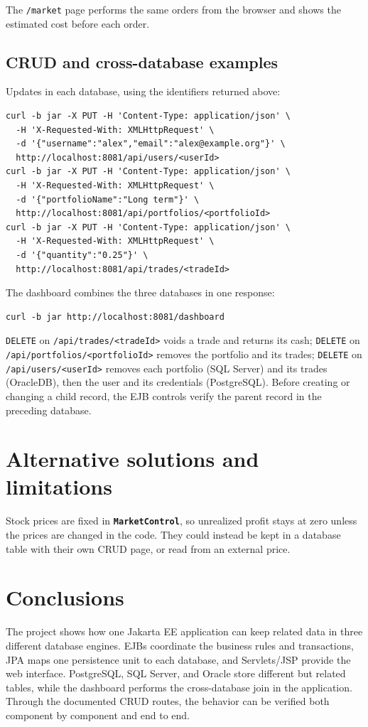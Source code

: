 \documentclass[12pt,a4paper]{article}
\newcommand{\code}[1]{\texttt{\small #1}}
\newcommand{\class}[1]{\textbf{\code{#1}}}
\begin{document}
The \code{/market} page performs the same orders from the browser and shows
the estimated cost before each order.

\subsection{CRUD and cross-database examples}

Updates in each database, using the identifiers returned above:

\begin{verbatim}
curl -b jar -X PUT -H 'Content-Type: application/json' \
  -H 'X-Requested-With: XMLHttpRequest' \
  -d '{"username":"alex","email":"alex@example.org"}' \
  http://localhost:8081/api/users/<userId>
curl -b jar -X PUT -H 'Content-Type: application/json' \
  -H 'X-Requested-With: XMLHttpRequest' \
  -d '{"portfolioName":"Long term"}' \
  http://localhost:8081/api/portfolios/<portfolioId>
curl -b jar -X PUT -H 'Content-Type: application/json' \
  -H 'X-Requested-With: XMLHttpRequest' \
  -d '{"quantity":"0.25"}' \
  http://localhost:8081/api/trades/<tradeId>
\end{verbatim}

The dashboard combines the three databases in one response:

\begin{verbatim}
curl -b jar http://localhost:8081/dashboard
\end{verbatim}

\code{DELETE} on \code{/api/trades/<tradeId>} voids a trade and returns its
cash; \code{DELETE} on \code{/api/portfolios/<portfolioId>} removes the
portfolio and its trades; \code{DELETE} on \code{/api/users/<userId>} removes
each portfolio (SQL Server) and its trades (OracleDB), then the user and its
credentials (PostgreSQL). Before creating or changing a child record, the EJB
controls verify the parent record in the preceding database.

\section{Alternative solutions and limitations}

Stock prices are fixed in \class{MarketControl}, so unrealized profit stays at
zero unless the prices are changed in the code. They could instead be kept
in a database table with their own CRUD page, or read from an external price.

\section{Conclusions}

The project shows how one Jakarta EE application can keep related data in
three different database engines. EJBs coordinate the business rules and
transactions, JPA maps one persistence unit to each database, and
Servlets/JSP provide the web interface. PostgreSQL, SQL Server, and Oracle
store different but related tables, while the dashboard performs the
cross-database join in the application. Through the documented CRUD routes,
the behavior can be verified both component by component and end to end.
\end{document}
